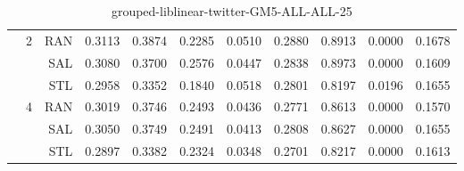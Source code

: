 \begin{center}
\begin{table}[htbp]
\begin{center}
\begin{tabular}{ | r | r | r | r | r | r | r | r | r | r | r |}
 & \multirow{3}{*}{2} & RAN & 0.3113 & 0.3874 & 0.2285 & 0.0510 & 0.2880 & 0.8913 & 0.0000 & 0.1678\\ \cline{3-11}
 &   & SAL & 0.3080 & 0.3700 & 0.2576 & 0.0447 & 0.2838 & 0.8973 & 0.0000 & 0.1609\\ \cline{3-11}
 &   & STL & 0.2958 & 0.3352 & 0.1840 & 0.0518 & 0.2801 & 0.8197 & 0.0196 & 0.1655\\ \cline{2-11}
 & \multirow{3}{*}{4} & RAN & 0.3019 & 0.3746 & 0.2493 & 0.0436 & 0.2771 & 0.8613 & 0.0000 & 0.1570\\ \cline{3-11}
 &   & SAL & 0.3050 & 0.3749 & 0.2491 & 0.0413 & 0.2808 & 0.8627 & 0.0000 & 0.1655\\ \cline{3-11}
 &   & STL & 0.2897 & 0.3382 & 0.2324 & 0.0348 & 0.2701 & 0.8217 & 0.0000 & 0.1613\\ \cline{2-11}
\hline
\end{tabular}
\caption{grouped-liblinear-twitter-GM5-ALL-ALL-25}
\end{center}
 \end{table}
\end{center}

